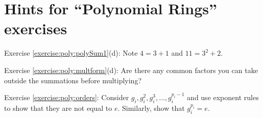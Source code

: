 \section{Hints for ``Polynomial Rings'' exercises}\label{sec:polyrings:hints} 

\noindent Exercise \ref{exercise:poly:polySum1}(d):  Note $4=3+1$ and $11=3^2+2$.

\noindent Exercise \ref{exercise:poly:multform}(d): Are there any common factors you can take outside 
the summations before multiplying?

\noindent Exercise \ref{exercise:poly:orders}:  Consider $g_i, g_i^2, g_i^3, \ldots, g_i^{p_i-1}$ and use exponent rules to show that they are not equal to $e$.  Similarly, show that $g_i^{p_i} = e$.
 